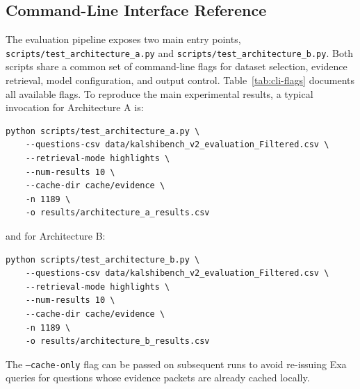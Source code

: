 

\subsection{Command-Line Interface Reference}
\label{sec:cli-reference}

The evaluation pipeline exposes two main entry points, \texttt{scripts/test\_architecture\_a.py} and \texttt{scripts/test\_architecture\_b.py}. Both scripts share a common set of command-line flags for dataset selection, evidence retrieval, model configuration, and output control. Table~\ref{tab:cli-flags} documents all available flags. To reproduce the main experimental results, a typical invocation for Architecture A is:

\begin{verbatim}
python scripts/test_architecture_a.py \
    --questions-csv data/kalshibench_v2_evaluation_Filtered.csv \
    --retrieval-mode highlights \
    --num-results 10 \
    --cache-dir cache/evidence \
    -n 1189 \
    -o results/architecture_a_results.csv
\end{verbatim}

\noindent and for Architecture B:

\begin{verbatim}
python scripts/test_architecture_b.py \
    --questions-csv data/kalshibench_v2_evaluation_Filtered.csv \
    --retrieval-mode highlights \
    --num-results 10 \
    --cache-dir cache/evidence \
    -n 1189 \
    -o results/architecture_b_results.csv
\end{verbatim}

\noindent The \texttt{--cache-only} flag can be passed on subsequent runs to avoid re-issuing Exa queries for questions whose evidence packets are already cached locally.


